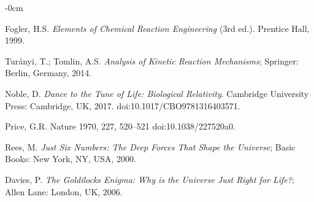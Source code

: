 \documentclass[life,article,submit,pdftex,moreauthors]{Definitions/mdpi}
\begin{document}
\begin{adjustwidth}{-\extralength}{0cm}
{\begin{thebibliography}{999}
Fogler, H.S. \textit{Elements of Chemical Reaction Engineering} (3rd ed.). Prentice Hall, 1999.

Turányi, T.; Tomlin, A.S. \textit{Analysis of Kinetic Reaction Mechanisms}; Springer: Berlin, Germany, 2014.

Noble, D. 
\textit{Dance to the Tune of Life: Biological Relativity}. 
Cambridge University Press: Cambridge, UK, 2017. 
doi:10.1017/CBO9781316403571.

Price, G.R.  Nature 1970, 227, 520–521 doi:10.1038/227520a0.

Rees, M. \textit{Just Six Numbers: The Deep Forces That Shape the Universe}; Basic Books: New York, NY, USA, 2000.

Davies, P. \textit{The Goldilocks Enigma: Why is the Universe Just Right for Life?}; Allen Lane: London, UK, 2006.

\end{thebibliography}
}



%


\PublishersNote{}
\end{adjustwidth}
\end{document}
